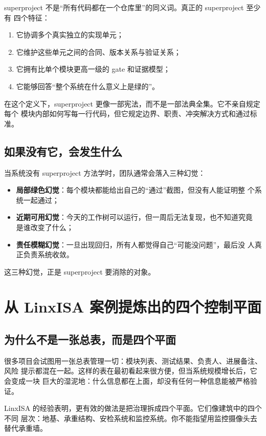 \documentclass[UTF8,11pt,a4paper,oneside]{ctexbook}
\begin{document}
superproject 不是“所有代码都在一个仓库里”的同义词。真正的 superproject 至少有
四个特征：

\begin{enumerate}
  \item 它协调多个真实独立的实现单元；
  \item 它维护这些单元之间的合同、版本关系与验证关系；
  \item 它拥有比单个模块更高一级的 gate 和证据模型；
  \item 它能够回答“整个系统在什么意义上是绿的”。
\end{enumerate}

在这个定义下，superproject 更像一部宪法，而不是一部法典全集。它不亲自规定每个
模块内部如何写每一行代码，但它规定边界、职责、冲突解决方式和通过标准。

\section{如果没有它，会发生什么}

当系统没有 superproject 方法学时，团队通常会落入三种幻觉：

\begin{itemize}
  \item \textbf{局部绿色幻觉}：每个模块都能给出自己的“通过”截图，但没有人能证明整
  个系统一起通过；
  \item \textbf{近期可用幻觉}：今天的工作树可以运行，但一周后无法复现，也不知道究竟
  是谁改变了什么；
  \item \textbf{责任模糊幻觉}：一旦出现回归，所有人都觉得自己“可能没问题”，最后没
  人真正负责系统收敛。
\end{itemize}

这三种幻觉，正是 superproject 要消除的对象。

\chapter{从 LinxISA 案例提炼出的四个控制平面}

\section{为什么不是一张总表，而是四个平面}

很多项目会试图用一张总表管理一切：模块列表、测试结果、负责人、进展备注、风险
提示都混在一起。这样的表在最初看起来很方便，但当系统规模增长后，它会变成一块
巨大的湿泥地：什么信息都在上面，却没有任何一种信息能被严格验证。

LinxISA 的经验表明，更有效的做法是把治理拆成四个平面。它们像建筑中的四个不同
层次：地基、承重结构、安检系统和监控系统。你不能指望用监控摄像头去替代承重墙。
\end{document}
